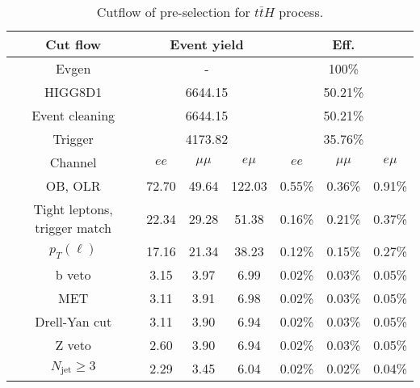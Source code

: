 \begin{table}
\centering\small
\begin{tabular}{c|ccc|ccc}
\hline
\hline
Cut flow &\multicolumn{3}{c|}{Event yield}&\multicolumn{3}{c}{Eff.}      \\
\hline
Evgen&\multicolumn{3}{c|}{-}&\multicolumn{3}{c}{100\%}\\
HIGG8D1&\multicolumn{3}{c|}{6644.15}&\multicolumn{3}{c}{50.21\%}\\
Event cleaning&\multicolumn{3}{c|}{6644.15}&\multicolumn{3}{c}{50.21\%}\\
Trigger&\multicolumn{3}{c|}{4173.82    }&\multicolumn{3}{c}{35.76\%}\\
Channel&$ee$&$\mu\mu$&$e\mu$&$ee$&$\mu\mu$&$e\mu$\\
\hline
OB, OLR    &72.70    &49.64    &122.03& 0.55\%    &0.36\%    &0.91\%\\
Tight leptons, trigger match    &22.34    &29.28    &51.38    &0.16\%    &0.21\%    &0.37\%\\
$p_T(\ell)$    &17.16    &21.34    &38.23    &0.12\%    &0.15\%    &0.27\%\\
b veto    &3.15    &3.97    &6.99    &0.02\%    &0.03\%    &0.05\%\\
MET    &3.11    &3.91    &6.98    &0.02\%    &0.03\%    &0.05\%\\
Drell-Yan cut    &3.11    &3.90    &6.94    &0.02\%    &0.03\%    &0.05\%\\
Z veto    &2.60    &3.90    &6.94    &0.02\%    &0.03\%    &0.05\%\\
$N_{\text{jet}}\geq3$    &2.29    &3.45    &6.04    &0.02\%    &0.02\%    &0.04\%\\
\hline
\hline
\end{tabular}
\caption{Cutflow of pre-selection for $t\bar{t}H$ process.}
\label{tab:cut_flow_preselection_ttH}
\end{table}

